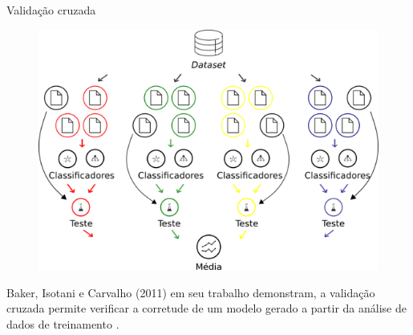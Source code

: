   \begin{frame}[fragile]{Validação cruzada}
    \begin{figure}[H]
        \begin{center}
            \includegraphics[scale=0.50]{images/validacao_cruzada.png}
        \end{center}
    \end{figure}
    Baker, Isotani e Carvalho (2011) em seu trabalho demonstram, a validação 
    cruzada permite verificar a corretude de um modelo gerado a partir da 
    análise de dados de treinamento \cite{baker2011mineraccao}.
  \end{frame}
